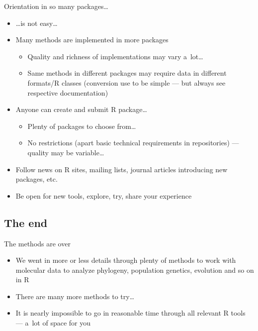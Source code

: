 \documentclass[compress, xelatex, 11pt, xcolor=svgnames, aspectratio=169,
	hyperref={
		bookmarks=true,
		unicode=true,
		colorlinks=true,
		pdftitle={Molecular data in R},
		plainpages=false,
		pdfauthor={Vojtech Zeisek},
		pdfsubject={Course about phylogeny and evolution in R},
		pdfcreator={XeLaTeX},
		pdfkeywords={R, evolution, phylogeny, molecular data},
		linkcolor=Crimson, %
		anchorcolor=Magenta, %
		citecolor=Magenta, %
		filecolor=Magenta, %
		menucolor=Magenta, %
		urlcolor=DodgerBlue, %
		},
	url={hyphens, lowtilde} %
	]{beamer}
\begin{document}
\begin{frame}{Orientation in so many packages\ldots}
	\begin{itemize}
		\item \ldots is not easy\ldots
		\item Many methods are implemented in more packages
		\begin{itemize}
			\item Quality and richness of implementations may vary a~lot\ldots
			\item Same methods in different packages may require data in different formats/R classes (conversion use to be simple --- but always see respective documentation)
		\end{itemize}
		\item Anyone can create and submit R package\ldots
		\begin{itemize}
			\item Plenty of packages to choose from\ldots
			\item No restrictions (apart basic technical requirements in repositories) --- quality may be variable\ldots
		\end{itemize}
		\item Follow news on R sites, mailing lists, journal articles introducing new packages, etc.
		\item Be open for new tools, explore, try, share your experience
	\end{itemize}
\end{frame}

\subsection{The end}

\begin{frame}{The methods are over}
	\begin{itemize}
		\item We went in more or less details through plenty of methods to work with molecular data to analyze phylogeny, population genetics, evolution and so on in R
		\item There are many more methods to try\ldots
		\item It is nearly impossible to go in reasonable time through all relevant R tools --- a~lot of space for you
	\end{itemize}
\end{frame}
\end{document}
